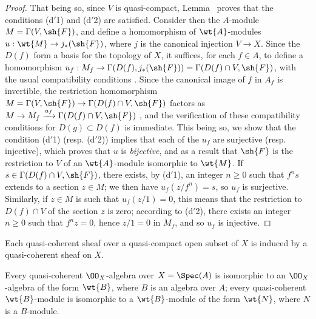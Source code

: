 \begin{proof}
That being so, since $V$ is quasi-compact, Lemma~ proves that
the conditions (d$'$1) and (d$'$2) are satisfied.
Consider then the $A$-module $M=\Gamma(V,\sh{F})$, and define a homomorphism of $\wt{A}$-modules $u:\wt{M}\to j_*(\sh{F})$, where $j$ is the canonical injection $V\to X$.
Since the $D(f)$ form a basis for the topology of $X$, it suffices, for each $f\in A$, to define a homomorphism $u_f:M_f\to\Gamma(D(f),j_*(\sh{F}))=\Gamma(D(f)\cap V,\sh{F})$, with the usual compatibility conditions .
Since the canonical image of $f$ in $A_f$ is invertible, the restriction homomorphism $M=\Gamma(V,\sh{F})\to\Gamma(D(f)\cap V,\sh{F})$ factors as $M\to M_f\xrightarrow{u_f}\Gamma(D(f)\cap V,\sh{F})$ , and the verification of these compatibility conditions for $D(g)\subset D(f)$ is immediate.
This being so, we show that the condition (d$'$1) (resp. (d$'$2)) implies that each of the $u_f$ are surjective (resp. injective), which proves that $u$ is \emph{bijective}, and as a result that $\sh{F}$ is the restriction to $V$ of an $\wt{A}$-module isomorphic to $\wt{M}$.
If $s\in\Gamma(D(f)\cap V,\sh{F})$, there exists, by (d$'$1), an integer $n\geq 0$ such that $f^n s$ extends to a section $z\in M$;
we then have $u_f(z/f^n)=s$, so $u_f$ is surjective.
Similarly, if $z\in M$ is such that $u_f(z/1)=0$, this means that the restriction to $D(f)\cap V$ of the section $z$ is zero;
according to (d$'$2), there exists an integer $n\geq 0$ such that $f^n z=0$, hence $z/1=0$ in $M_f$, and so $u_f$ is injective.
\end{proof}

\begin{cor}[1.4.2]
\label{1.1.4.2}
Each quasi-coherent sheaf over a quasi-compact open subset of $X$ is induced by a quasi-coherent sheaf on $X$.
\end{cor}

\begin{cor}[1.4.3]
\label{1.1.4.3}
Every quasi-coherent $\OO_X$-algebra over $X=\Spec(A)$ is isomorphic to an $\OO_X$-algebra of the form $\wt{B}$, where $B$ is an algebra over $A$;
every quasi-coherent $\wt{B}$-module is isomorphic to a $\wt{B}$-module of the form $\wt{N}$, where $N$ is a $B$-module.
\end{cor}

